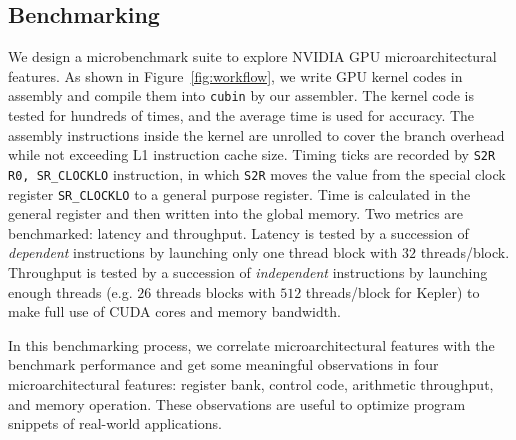 \subsection{Benchmarking} %
\label{sec:benchmark}


We design a microbenchmark suite to explore NVIDIA GPU microarchitectural features.
As shown in Figure~\ref{fig:workflow}, we write GPU kernel codes in assembly and compile them into {\tt cubin} by our assembler. %
The kernel code is tested for hundreds of times, and the average time is used for accuracy.
The assembly instructions inside the kernel are unrolled to cover the branch overhead while not exceeding L1 instruction cache size.
Timing ticks are recorded by {\tt S2R R0, SR\_CLOCKLO} instruction, in which
{\tt S2R} moves the value from the special clock register {\tt SR\_CLOCKLO} to a general
purpose register. 
Time is calculated in the general register and then written into the global memory.
Two metrics are benchmarked: latency and throughput. 
Latency is tested by a succession of \emph{dependent} instructions by launching only one thread block with $32$ threads/block.
Throughput is tested by a succession of \emph{independent} instructions by launching enough
threads (e.g. $26$ threads blocks with $512$ threads/block for Kepler) to make full use of CUDA cores and memory bandwidth.

In this benchmarking process, we correlate microarchitectural features with the benchmark performance and get some meaningful observations in four microarchitectural features: register bank, 
control code, arithmetic throughput, and memory operation. 
These observations are useful to optimize program snippets of real-world applications.


